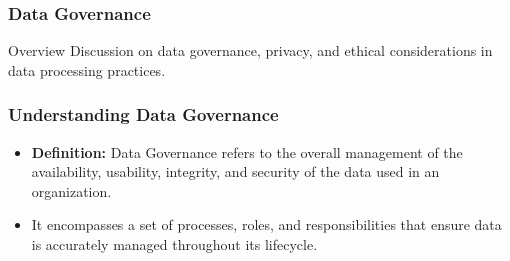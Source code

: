 \documentclass[aspectratio=169]{beamer}
\begin{document}
\begin{frame}[fragile]
    \frametitle{Data Governance}
    \begin{block}{Overview}
        Discussion on data governance, privacy, and ethical considerations in data processing practices.
    \end{block}
\end{frame}

\begin{frame}[fragile]
    \frametitle{Understanding Data Governance}
    \begin{itemize}
        \item \textbf{Definition:} Data Governance refers to the overall management of the availability, usability, integrity, and security of the data used in an organization.
        \item It encompasses a set of processes, roles, and responsibilities that ensure data is accurately managed throughout its lifecycle.
    \end{itemize}
\end{frame}
\end{document}
